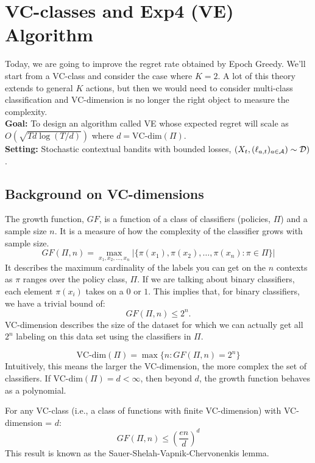 \documentclass[11pt]{article}
\begin{document}
\section{VC-classes and Exp4 (VE) Algorithm \cite{beygelzimer2011contextual}}
Today, we are going to improve the regret rate obtained by Epoch Greedy. We'll start from a VC-class and consider the case where $K=2$. A lot of this theory extends to general $K$ actions, but then we would need to consider multi-class classification and VC-dimension is no longer the right object to measure the complexity. \hfill
\newline \\
\textbf{Goal:} To design an algorithm called VE whose expected regret will scale as $O(\sqrt{Td\log(T/d)})$ where $d = \text{VC-dim}(\Pi)$. \hfill
\newline\\
\textbf{Setting:} Stochastic contextual bandits with bounded losses, $(X_t,(\ell_{a,t})_{a\in\mathcal{A}})\sim\mathcal{D})$. 



\subsection{Background on VC-dimensions}
The growth function, $GF$, is a function of a class of classifiers (policies, $\Pi$) and a sample size $n$. It is a measure of how the complexity of the classifier grows with sample size.
\begin{equation}
GF(\Pi,n) = \max_{x_1,x_2,\ldots, x_n} | \{\pi(x_1),\pi(x_2),\ldots,\pi(x_n): \pi \in \Pi\}|
\end{equation}
It describes the maximum cardinality of the labels you can get on the $n$ contexts as $\pi$ ranges over the policy class, $\Pi$. If we are talking about binary classifiers, each element $\pi(x_i)$ takes on a $0$ or $1$. This implies that, for binary classifiers, we have a trivial bound of: 
$$
GF(\Pi,n) \le 2^n.
$$
VC-dimension describes the size of the dataset for which we can actually get all $2^n$ labeling on this data set using the classifiers in $\Pi$.

\begin{equation}
\text{VC-dim}(\Pi) = \max \{n: GF(\Pi,n) = 2^n\}
\end{equation}
Intuitively, this means the larger the VC-dimension, the more complex the set of classifiers. If VC-dim$(\Pi) = d < \infty$, then beyond $d$, the growth function behaves as a polynomial. 

For any VC-class (i.e., a class of functions with finite VC-dimension) with VC-dimension = $d$:
\begin{equation}\label{eq: growth function bound}
GF(\Pi, n) \le \left(\frac{en}{d}\right)^d
\end{equation}
This result is known as the Sauer-Shelah-Vapnik-Chervonenkis lemma.
\end{document}
